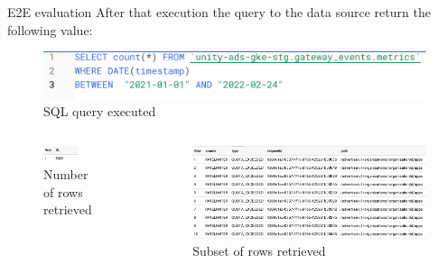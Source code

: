 \documentclass[10pt]{beamer}
\begin{document}
\begin{frame}[fragile]{E2E evaluation}
    After that execution the query to the data source return the following value:
    
    \begin{figure}
        \centering
        \includegraphics[scale=0.5]{src/presentation/img/bigquer-query.png}
        \caption{SQL query executed}
    \end{figure}
    
    \begin{columns}
        \begin{figure}
            \centering
            \includegraphics[width=0.6\textwidth]{src/presentation/img/bigquery-number.png}
            \caption{Number of rows retrieved}
            \label{fig:my_label}
        \end{figure}
        
        \begin{figure}
            \centering
            \includegraphics[width=\textwidth]{src/presentation/img/bigquery-rows.png}
            \caption{Subset of rows retrieved}
            \label{fig:my_label}
        \end{figure}
    \end{columns}
\end{frame}
\end{document}
